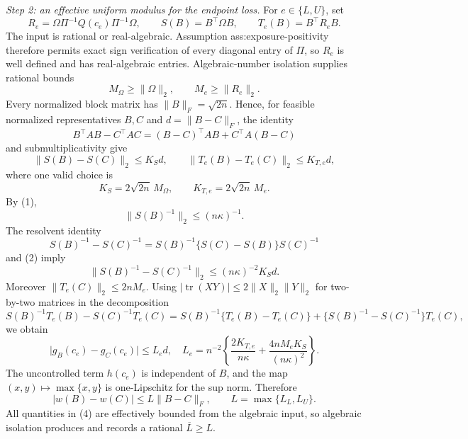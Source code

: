 \emph{Step 2: an effective uniform modulus for the endpoint loss.}
For \(e\in\{L,U\}\), set
\[
R_e=\Omega\Pi^{-1}Q(c_e)\Pi^{-1}\Omega,
\qquad
S(B)=B^{\top}\Omega B,
\qquad
T_e(B)=B^{\top}R_eB.
\]
The input is rational or real-algebraic.  Assumption ass:exposure-positivity therefore permits exact sign verification of every diagonal entry of \(\Pi\), so \(R_e\) is well defined and has real-algebraic entries.  Algebraic-number isolation supplies rational bounds
\[
M_\Omega\ge\lVert\Omega\rVert_2,
\qquad
M_e\ge\lVert R_e\rVert_2.
\]
Every normalized block matrix has \(\lVert B\rVert_F=\sqrt{2n}\).  Hence, for feasible normalized representatives \(B,C\) and \(d=\lVert B-C\rVert_F\), the identity
\[
B^{\top}AB-C^{\top}AC
=(B-C)^{\top}AB+C^{\top}A(B-C)
\]
and submultiplicativity give
\[
\lVert S(B)-S(C)\rVert_2\le K_Sd,
\qquad
\lVert T_e(B)-T_e(C)\rVert_2\le K_{T,e}d, \tag{2}
\]
where one valid choice is
\[
K_S=2\sqrt{2n}\,M_\Omega,
\qquad
K_{T,e}=2\sqrt{2n}\,M_e.
\]
By (1),
\[
\lVert S(B)^{-1}\rVert_2\le(n\kappa)^{-1}.
\]
The resolvent identity
\[
S(B)^{-1}-S(C)^{-1}
=S(B)^{-1}\{S(C)-S(B)\}S(C)^{-1}
\]
and (2) imply
\[
\lVert S(B)^{-1}-S(C)^{-1}\rVert_2
\le (n\kappa)^{-2}K_Sd. \tag{3}
\]
Moreover \(\lVert T_e(C)\rVert_2\le2nM_e\).  Using
\(\lvert\operatorname{tr}(XY)\rvert\le2\lVert X\rVert_2\lVert Y\rVert_2\)
for two-by-two matrices in the decomposition
\[
S(B)^{-1}T_e(B)-S(C)^{-1}T_e(C)
=S(B)^{-1}\{T_e(B)-T_e(C)\}
+\{S(B)^{-1}-S(C)^{-1}\}T_e(C),
\]
we obtain
\[
\lvert g_B(c_e)-g_C(c_e)\rvert\le L_ed,
\quad
L_e=n^{-2}\left\{
\frac{2K_{T,e}}{n\kappa}
+\frac{4nM_eK_S}{(n\kappa)^2}
\right\}. \tag{4}
\]
The uncontrolled term \(h(c_e)\) is independent of \(B\), and the map \((x,y)\mapsto\max\{x,y\}\) is one-Lipschitz for the sup norm.  Therefore
\[
\lvert w(B)-w(C)\rvert
\le L\lVert B-C\rVert_F,
\qquad L=\max\{L_L,L_U\}. \tag{5}
\]
All quantities in (4) are effectively bounded from the algebraic input, so algebraic isolation produces and records a rational \(\overline L\ge L\).


